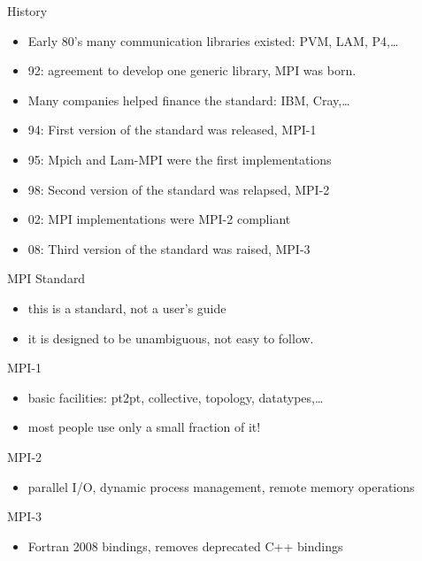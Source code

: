 \documentclass[aspectratio=43]{beamer}
\begin{document}
\begin{frame}{History}
\begin{itemize}
\item Early 80's many communication libraries existed: PVM, LAM, P4,\ldots
\item 92: agreement to develop one generic library, MPI was born.
\item Many companies helped finance the standard: IBM, Cray,\ldots
\item 94: First version of the standard was released, MPI-1
\item 95: Mpich and Lam-MPI were the first implementations
\item 98: Second version of the standard was relapsed, MPI-2
\item 02: MPI implementations were MPI-2 compliant
\item 08: Third version of the standard was raised, MPI-3
\end{itemize}
\end{frame}

\begin{frame}{MPI Standard}
\begin{itemize}
\item this is a standard, not a user’s guide
\item it is designed to be unambiguous, not easy to follow.
\end{itemize}

\begin{blue2block}{MPI-1}
\begin{itemize}
\item basic facilities: pt2pt, collective, topology, datatypes,\ldots
\item most people use only a small fraction of it!
\end{itemize}
\end{blue2block}

\begin{blue2block}{MPI-2}
\begin{itemize}
\item parallel I/O, dynamic process management, remote memory operations
\end{itemize}
\end{blue2block}

\begin{blue2block}{MPI-3}
\begin{itemize}
\item Fortran 2008 bindings, removes deprecated C++ bindings
\end{itemize}
\end{blue2block}

\end{frame}
\end{document}
